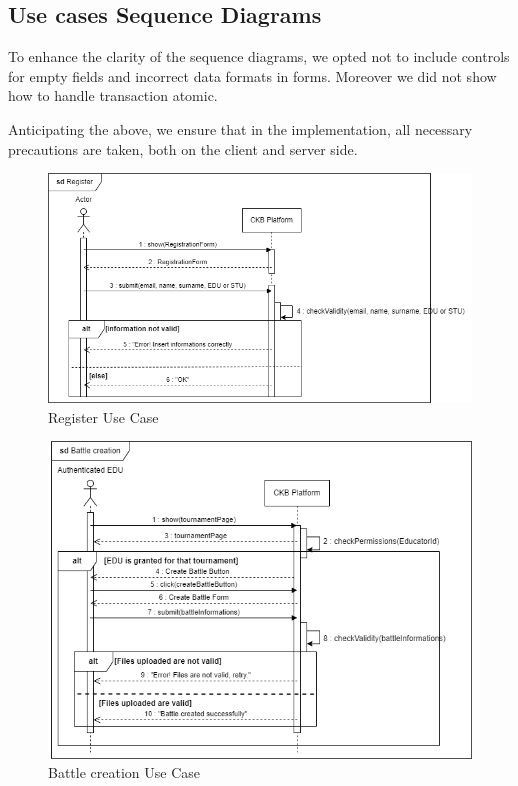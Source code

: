 \subsection{Use cases Sequence Diagrams}
To enhance the clarity of the sequence diagrams, we opted not to include controls for empty fields and incorrect data formats in forms.
Moreover we did not show how to handle transaction atomic. 

Anticipating the above, we ensure that in the implementation, all necessary precautions are taken, both on the client and server side.

\begin{figure}[H]
    \centering
    \includegraphics[width=1\textwidth]{images/sequence_diagrams/ClassDiagram-UC1 -SequenceDiagram.png}
    \caption{Register Use Case}
    \label{fig:uc1}
\end{figure}
\begin{figure}[H]
    \centering
    \includegraphics[width=1\textwidth]{images/sequence_diagrams/ClassDiagram-UC4- SequenceDiagram.png}
    \caption{Battle creation Use Case}
    \label{fig:uc4}
\end{figure}
